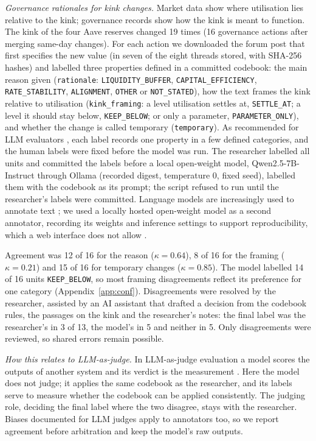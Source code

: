 \documentclass[11pt]{article}
\newcommand{\code}[1]{\texttt{\small #1}}
\begin{document}
\emph{Governance rationales for kink changes.} Market data show where utilisation lies relative to the kink; governance records show how the kink is meant to function. The kink of the four Aave reserves changed 19 times (16 governance actions after merging same-day changes). For each action we downloaded the forum post that first specifies the new value (in seven of the eight threads stored, with SHA-256 hashes) and labelled three properties defined in a committed codebook: the main reason given (\code{rationale}: \code{LIQUIDITY\_BUFFER}, \code{CAPITAL\_EFFICIENCY}, \code{RATE\_STABILITY}, \code{ALIGNMENT}, \code{OTHER} or \code{NOT\_STATED}), how the text frames the kink relative to utilisation (\code{kink\_framing}: a level utilisation settles at, \code{SETTLE\_AT}; a level it should stay below, \code{KEEP\_BELOW}; or only a parameter, \code{PARAMETER\_ONLY}), and whether the change is called temporary (\code{temporary}). As recommended for LLM evaluators \citep{samuylova2026judge}, each label records one property in a few defined categories, and the human labels were fixed before the model was run. The researcher labelled all units and committed the labels before a local open-weight model, Qwen2.5-7B-Instruct \citep{qwen2024qwen25} through Ollama (recorded digest, temperature 0, fixed seed), labelled them with the codebook as its prompt; the script refused to run until the researcher's labels were committed. Language models are increasingly used to annotate text \citep{gilardi2023chatgpt}; we used a locally hosted open-weight model as a second annotator, recording its weights and inference settings to support reproducibility, which a web interface does not allow \citep{spirling2023open,kim2024prometheus}.

Agreement was 12 of 16 for the reason ($\kappa=0.64$), 8 of 16 for the framing ($\kappa=0.21$) and 15 of 16 for temporary changes ($\kappa=0.85$). The model labelled 14 of 16 units \code{KEEP\_BELOW}, so most framing disagreements reflect its preference for one category (Appendix~\ref{app:conf}). Disagreements were resolved by the researcher, assisted by an AI assistant that drafted a decision from the codebook rules, the passages on the kink and the researcher's notes: the final label was the researcher's in 3 of 13, the model's in 5 and neither in 5. Only disagreements were reviewed, so shared errors remain possible.

\emph{How this relates to LLM-as-judge.} In LLM-as-judge evaluation a model scores the outputs of another system and its verdict is the measurement \citep{zheng2023judging}. Here the model does not judge; it applies the same codebook as the researcher, and its labels serve to measure whether the codebook can be applied consistently. The judging role, deciding the final label where the two disagree, stays with the researcher. Biases documented for LLM judges apply to annotators too, so we report agreement before arbitration and keep the model's raw outputs.
\end{document}

